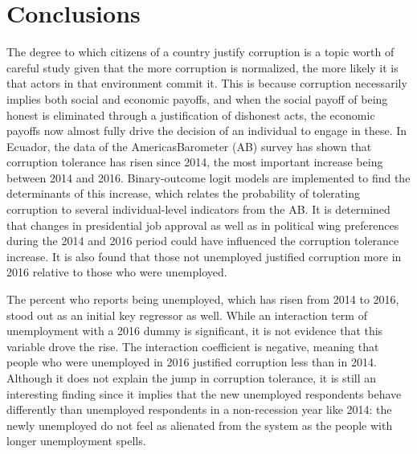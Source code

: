 \documentclass[12pt,a4]{article}\usepackage[]{graphicx}\usepackage[]{xcolor}
\begin{document}




\section{Conclusions}

The degree to which citizens of a country justify corruption is a topic worth of careful study given that the more corruption is normalized, the more likely it is that actors in that environment commit it. This is because corruption necessarily implies both social and economic payoffs, and when the social payoff of being honest is eliminated through a justification of dishonest acts, the economic payoffs now almost fully drive the decision of an individual to engage in these. In Ecuador, the data of the AmericasBarometer (AB) survey has shown that corruption tolerance has risen since 2014, the most important increase being between 2014 and 2016. Binary-outcome logit models are implemented to find the determinants of this increase, which relates the probability of tolerating corruption to several individual-level indicators from the AB. It is determined that changes in presidential job approval as well as in political wing preferences during the 2014 and 2016 period could have influenced the corruption tolerance increase. It is also found that those not unemployed justified corruption more in 2016 relative to those who were unemployed.

The percent who reports being unemployed, which has risen from 2014 to 2016, stood out as an initial key regressor as well. While an interaction term of unemployment with a 2016 dummy is significant, it is not evidence that this variable drove the rise. The interaction coefficient is negative, meaning that people who were unemployed in 2016 justified corruption less than in 2014. Although it does not explain the jump in corruption tolerance, it is still an interesting finding since it implies that the new unemployed respondents behave differently than unemployed respondents in a non-recession year like 2014: the newly unemployed do not feel as alienated from the system as the people with longer unemployment spells.
\end{document}
